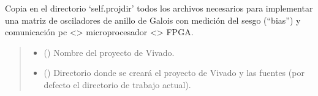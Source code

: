 \documentclass[letterpaper,10pt,english]{sphinxmanual}
\begin{document}
\begin{fulllineitems}
\begin{fulllineitems}
\end{fulllineitems}


\begin{fulllineitems}
\label{\detokenize{fpga.ring_osc:fpga.ring_osc.GaloisMatrix.implement}}
\pysigstartsignatures
{}
\pysigstopsignatures
\sphinxAtStartPar
Copia en el directorio ‘self.projdir’ todos los archivos necesarios para implementar una matriz de osciladores de anillo de Galois con medición del sesgo (“bias”) y comunicación pc \textless{}\sphinxhyphen{}\textgreater{} microprocesador \textless{}\sphinxhyphen{}\textgreater{} FPGA.
\begin{quote}\begin{description}
\begin{itemize}
\item {} 
\sphinxAtStartPar
{} (\sphinxstyleliteralemphasis{\sphinxupquote{, }}) \textendash{} Nombre del proyecto de Vivado.

\item {} 
\sphinxAtStartPar
{} (\sphinxstyleliteralemphasis{\sphinxupquote{, }}) \textendash{} Directorio donde se creará el proyecto de Vivado y las fuentes (por defecto el directorio de trabajo actual).


\end{itemize}
\end{description}
\end{quote}
\end{fulllineitems}
\end{fulllineitems}
\end{document}
